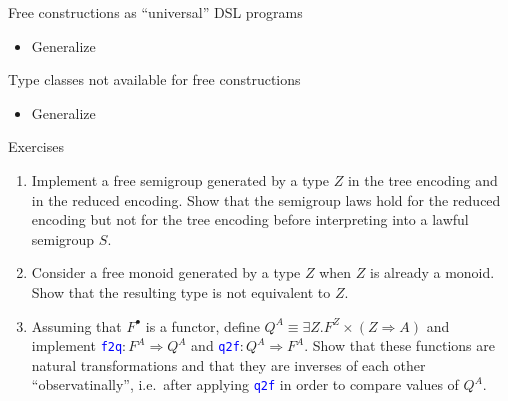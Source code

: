 \documentclass[english,,russian]{beamer}
\begin{document}
\begin{frame}{Free constructions as ``universal'' DSL programs}
\begin{itemize}
\item Generalize
\end{itemize}
\end{frame}

\begin{frame}{Type classes not available for free constructions}
\begin{itemize}
\item Generalize
\end{itemize}
\end{frame}

\begin{frame}{Exercises}
\begin{enumerate}
\item {\footnotesize{}\vspace{-0.15cm}Implement a free semigroup generated
by a type $Z$ in the tree encoding and in the reduced encoding. Show
that the semigroup laws hold for the reduced encoding but not for
the tree encoding before interpreting into a lawful semigroup $S$.}{\footnotesize\par}
\item {\footnotesize{}Consider a free monoid generated by a type $Z$ when
$Z$ is already a monoid. Show that the resulting type is not equivalent
to $Z$. }{\footnotesize\par}
\item {\footnotesize{}Assuming that $F^{\bullet}$ is a functor, define
$Q^{A}\equiv\exists Z.F^{Z}\times\left(Z\Rightarrow A\right)$ and
implement }\texttt{\textcolor{blue}{\footnotesize{}f2q}}{\footnotesize{}$:F^{A}\Rightarrow Q^{A}$
and }\texttt{\textcolor{blue}{\footnotesize{}q2f}}{\footnotesize{}$:Q^{A}\Rightarrow F^{A}$.
Show that these functions are natural transformations and that they
are inverses of each other ``observatinally'', i.e.~after applying
}\texttt{\textcolor{blue}{\footnotesize{}q2f}}{\footnotesize{} in
order to compare values of $Q^{A}$.}{\footnotesize\par}
\end{enumerate}
\end{frame}
\end{document}
